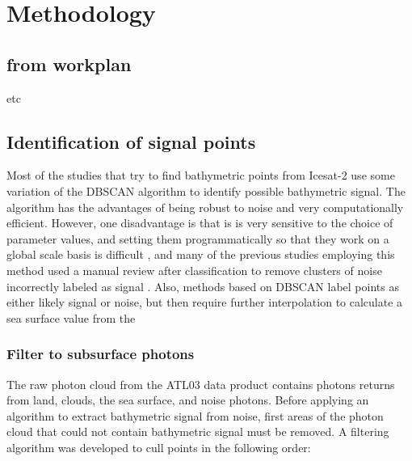 \chapter{Methodology}

\section*{from workplan}
etc

\section{Identification of signal points}
Most of the studies that try to find bathymetric points from Icesat-2 use some variation of the DBSCAN algorithm to identify possible bathymetric signal. The algorithm has the advantages of being robust to noise \cite{} and very computationally efficient. However, one disadvantage is that is is very sensitive to the choice of parameter values, and setting them programmatically so that they work on a global scale basis is difficult \cite{} , and many of the previous studies employing this method used a manual review after classification to remove clusters of noise incorrectly labeled as signal \parencite{} . Also, methods based on DBSCAN label points as either likely signal or noise, but then require further interpolation to calculate a sea surface value from the 


\subsection{Filter to subsurface photons}

The raw photon cloud from the ATL03 data product contains photons returns from land, clouds, the sea surface, and noise photons. Before applying an algorithm to extract bathymetric signal from noise, first areas of the photon cloud that could not contain bathymetric signal must be removed. A filtering algorithm was developed to cull points in the following order:

